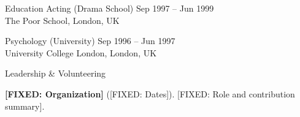 \documentclass{resume}
\begin{document}

\begin{rSection}{Education}
{Acting (Drama School)} \hfill {\textcolor{black!60}{Sep 1997 -- Jun 1999}}\\
{The Poor School}, London, UK

{Psychology (University)} \hfill {\textcolor{black!60}{Sep 1996 -- Jun 1997}}\\
{University College London}, London, UK
\end{rSection}
\vspace{-0.15cm}


\begin{rSection2}{Leadership \& Volunteering}
\item \textbf{[FIXED: Organization]} ([FIXED: Dates]). [FIXED: Role and contribution summary].
\end{rSection2}
\vspace{-0.15cm}
\end{document}
